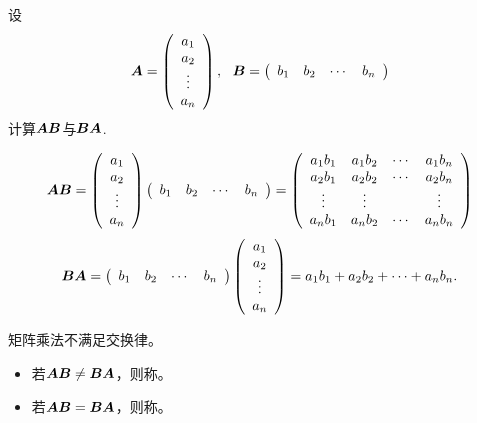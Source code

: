 \begin{frame}
\begin{li}
  设
  $$
  \boldsymbol{A} = \left(
    \begin{array}{c}
      a_1\\
      a_2\\
      \vdots\\
      a_n
    \end{array}
  \right), ~~
  \boldsymbol{B} = \left(
    \begin{array}{cccc}
      b_1 & b_2 & \cdots & b_n
    \end{array}
  \right)
  $$
  计算$\boldsymbol{A}\boldsymbol{B}$与$\boldsymbol{B}\boldsymbol{A}$.
\end{li}
\begin{jie}
  $$
  \boldsymbol{A}\boldsymbol{B} = \left(
    \begin{array}{c}
      a_1\\
      a_2\\
      \vdots\\
      a_n
    \end{array}
  \right)\left(
    \begin{array}{cccc}
      b_1 & b_2 & \cdots & b_n
    \end{array}
  \right) 
  = \left(
    \begin{array}{cccc}
      a_1b_1 & a_1b_2 & \cdots & a_1b_n\\
      a_2b_1 & a_2b_2 & \cdots & a_2b_n\\
      \vdots & \vdots & & \vdots\\
      a_nb_1 & a_nb_2 & \cdots & a_nb_n
    \end{array}
  \right)
  $$  
  $$
  \boldsymbol{B}\boldsymbol{A} = \left(
    \begin{array}{cccc}
      b_1 & b_2 & \cdots & b_n
    \end{array}
  \right)\left(
    \begin{array}{c}
      a_1\\
      a_2\\
      \vdots\\
      a_n
    \end{array}
  \right)  
  = a_1b_1+a_2b_2+\cdots+a_nb_n.
  $$
\end{jie}
\end{frame}

\begin{frame}
 矩阵乘法不满足交换律。
\begin{itemize}
\item 若$\boldsymbol{A}\boldsymbol{B}\ne\boldsymbol{B}\boldsymbol{A}$，则称。
\item 若$\boldsymbol{A}\boldsymbol{B}=\boldsymbol{B}\boldsymbol{A}$，则称。  
\end{itemize}
\end{frame}

